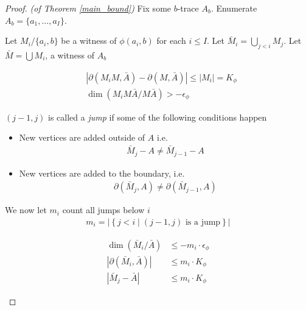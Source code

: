 \documentclass{amsart}
\newcommand{\curly}[1]{\left\{#1\right\}}
\newcommand{\abs}[1]{\left|#1\right|}
\begin{document}
\begin{proof} \textit{(of Theorem \ref{main_bound})}
	Fix some $b$-trace $A_b$. Enumerate $A_b = \{a_1, \ldots, a_I\}$.

	Let $M_i / \{a_i, b\}$ be a witness of $\phi(a_i, b)$ for each $i \leq I$.
	Let $\bar M_i = \bigcup_{j < i} M_j$.
	Let $\bar M = \bigcup M_i$, a witness of $A_b$
	
	\begin{Claim}
		\begin{align*}
			&\abs{\partial(M_i M, \bar A) - \partial(M, \bar A)} \leq |M_i| = K_\phi\\
			&\dim(M_i M \bar A / M \bar A) > -\epsilon_\phi
		\end{align*}
	\end{Claim}
	
	\begin{Definition}
		$(j-1, j)$ is called a \emph{jump} if some of the following conditions happen
		\begin{itemize}
			\item New vertices are added outside of $A$ i.e.
				\begin{align*}
					\bar M_j - A \neq \bar M_{j-1} - A
				\end{align*}
			\item New vertices are added to the boundary, i.e.
				\begin{align*}
					\partial(\bar M_j, A) \neq \partial(\bar M_{j-1}, A)
				\end{align*}
		\end{itemize}
	\end{Definition}

	\begin{Definition}
		We now let $m_i$ count all jumps below $i$
		\begin{align*}
			m_i = \abs{\curly{j < i \mid (j-1, j) \text{ is a jump}}}
		\end{align*}
	\end{Definition}

	\begin{Lemma} \label{ub_lemma}
		\begin{align*}
			\dim(\bar M_i / \bar A) &\leq -m_i \cdot \epsilon_\phi \\
			|\partial(\bar M_i, \bar A)| &\leq m_i \cdot K_\phi \\
			|\bar M_j - \bar A| &\leq m_i \cdot K_\phi
		\end{align*}
	\end{Lemma}


\end{proof}
\end{document}
